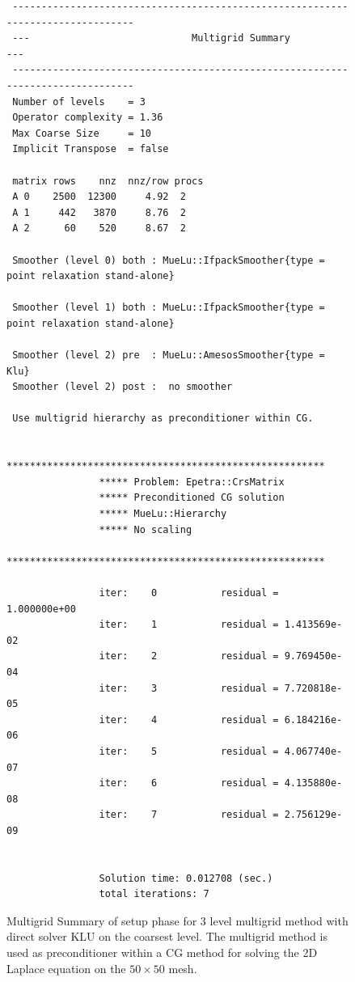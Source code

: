 \documentclass[12pt,a4paper]{article}
\begin{document}
\begin{figure}
\tiny
\begin{minipage}{\textwidth}
\begin{verbatim}
 --------------------------------------------------------------------------------
 ---                            Multigrid Summary                             ---
 --------------------------------------------------------------------------------
 Number of levels    = 3
 Operator complexity = 1.36
 Max Coarse Size     = 10
 Implicit Transpose  = false

 matrix rows    nnz  nnz/row procs
 A 0    2500  12300     4.92  2
 A 1     442   3870     8.76  2
 A 2      60    520     8.67  2

 Smoother (level 0) both : MueLu::IfpackSmoother{type = point relaxation stand-alone}

 Smoother (level 1) both : MueLu::IfpackSmoother{type = point relaxation stand-alone}

 Smoother (level 2) pre  : MueLu::AmesosSmoother{type = Klu}
 Smoother (level 2) post :  no smoother

 Use multigrid hierarchy as preconditioner within CG.

                *******************************************************
                ***** Problem: Epetra::CrsMatrix
                ***** Preconditioned CG solution
                ***** MueLu::Hierarchy
                ***** No scaling
                *******************************************************

                iter:    0           residual = 1.000000e+00
                iter:    1           residual = 1.413569e-02
                iter:    2           residual = 9.769450e-04
                iter:    3           residual = 7.720818e-05
                iter:    4           residual = 6.184216e-06
                iter:    5           residual = 4.067740e-07
                iter:    6           residual = 4.135880e-08
                iter:    7           residual = 2.756129e-09


                Solution time: 0.012708 (sec.)
                total iterations: 7
\end{verbatim}
\end{minipage}
\caption{Multigrid Summary of setup phase for 3 level multigrid method with direct solver KLU on the coarsest level. The multigrid method is used as preconditioner within a CG method for solving the 2D Laplace equation on the $50\times 50$ mesh.}
\label{fig:directsolver}
\end{figure}
\end{document}

